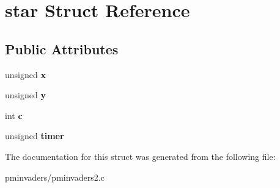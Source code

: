 \hypertarget{structstar}{}\section{star Struct Reference}
\label{structstar}
\subsection*{Public Attributes}
\begin{DoxyCompactItemize}
\item 
\mbox{\label{structstar_aadf78ce4cc450f9fe506f6bb6225fb4c}} 
unsigned {\bfseries x}
\item 
\mbox{\label{structstar_a0f4d64c09b6be7308a5a65350647e6ca}} 
unsigned {\bfseries y}
\item 
\mbox{\label{structstar_af9b04074dc0018b54465ebc4c1857463}} 
int {\bfseries c}
\item 
\mbox{\label{structstar_a3c47d19eb9bbda44d98127887afb94e3}} 
unsigned {\bfseries timer}
\end{DoxyCompactItemize}


The documentation for this struct was generated from the following file\+:\begin{DoxyCompactItemize}
\item 
pminvaders/pminvaders2.\+c\end{DoxyCompactItemize}
